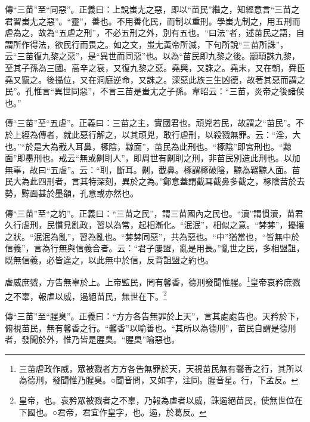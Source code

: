 {\noindent\zhuan{}\fzbyks 傳“三苗”至“同惡”。正義曰：上說蚩尢之惡，即以“苗民”繼之，知經意言“三苗之君習蚩尢之惡”。“靈”，善也。不用善化民，而制以重刑。學蚩尢制之，用五刑而虐為之，故為“五虐之刑”，不必五刑之外，別有五也。“曰法”者，述苗民之語，自謂所作得法，欲民行而畏之。如之文，蚩尢黃帝所滅，下句所說“三苗所誅”，云“三苗復九黎之惡”，是“異世而同惡”也。以為“苗民即九黎之後。顓頊誅九黎，至其子孫為三國。高辛之衰，又復九黎之惡。堯興，又誅之。堯末，又在朝，舜臣堯又竄之。後攝位，又在洞庭逆命，又誅之。深惡此族三生凶德，故著其惡而謂之民”。孔惟言“異世同惡”，不言三苗是蚩尢之子孫。韋昭云：“三苗，炎帝之後諸侯也。” \par}

{\noindent\zhuan{}\fzbyks 傳“三苗”至“五虐”。正義曰：三苗之主，實國君也。頑兇若民，故謂之“苗民”。不於上經為傳者，就此惡行解之，以其頑兇，敢行虐刑，以殺戮無罪。云：“淫，大也。”“於是大為截人耳鼻，椓陰，黥面”，苗民為此刑也。“椓陰”即宮刑也。“黥面”即墨刑也。戒云“無或劓刵人”，即周世有劓刵之刑，非苗民別造此刑也。以加無辜，故曰“五虐”。云：“刵，斷耳。劓，截鼻。椓謂椓破陰，黥為羈黥人面。苗民大為此四刑者，言其特深刻，異於之為。”鄭意蓋謂截耳截鼻多截之，椓陰苦於去勢，黥面甚於墨頟，孔意或亦然也。 \par}

{\noindent\zhuan{}\fzbyks 傳“三苗”至“之約”。正義曰：“三苗之民”，謂三苗國內之民也。“瀆”謂慣瀆，苗君久行虐刑，民慣見亂政，習以為常，起相漸化。“泯泯”，相似之意。“棼棼”，擾攘之狀。“泯泯為亂”，習為亂也。“棼棼同惡”，共為惡也。“中”猶當也，“皆無中於信義”，言為行無與信義合者。云：“君子屢盟，亂是用長。”亂世之民，多相盟詛，既無信義，必皆違之，以此無中於信，反背詛盟之約也。 \par}

虐威庶戮，方告無辜於上。上帝監民，罔有馨香，德刑發聞惟腥。\footnote{三苗虐政作威，眾被戮者方方各告無罪於天，天視苗民無有馨香之行，其所以為德刑，發聞惟乃腥臭。○聞音問，又如字，注同。腥音星。行，下孟反。}皇帝哀矜庶戮之不辜，報虐以威，遏絕苗民，無世在下。\footnote{皇帝，也。哀矜眾被戮者之不辜，乃報為虐者以威，誅遏絕苗民，使無世位在下國也。○君帝，君宜作皇字，也。遏，於葛反。}

{\noindent\zhuan{}\fzbyks 傳“三苗”至“腥臭”。正義曰：“方方各告無罪於上天”，言其處處告也。天矜於下，俯視苗民，無有馨香之行。“馨香”以喻善也。“其所以為德刑”，苗民自謂是德刑者，發聞於外，惟乃皆是腥臭。“腥臭”喻惡也。 \par}

